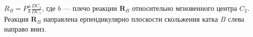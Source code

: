 $R_B = P\frac{a}{b}\frac{DC_2}{DC_1}$,
где $b$ --- плечо реакции $\boldsymbol{R}_B$
относительно мгновенного центра $C_2$.
Реакция $\boldsymbol{R}_B$ направлена
ерпендикулярно плоскости скольжения катка $B$
слева направо вниз.
